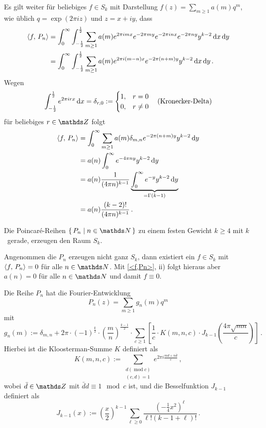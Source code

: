 \begin{bewe-list}
Es gilt weiter für beliebiges $f \in S_k$ mit Darstellung $f(z) = \sum_{m \geq 1} a(m)q^m$, wie üblich $q = \exp(2\pi iz)$ und $z = x + iy$, dass
\begin{align*}
	\scalarprd {f}{P_n} &= \int_0^\infty \int_{-\frac 12}^{\frac 12} \sum_{m \geq 1} a(m) e^{2 \pi imx}e^{-2\pi my}e^{-2\pi inx}e^{-2\pi ny}y^{k-2} \opd x \opd y\\
	&= \int_0^\infty \int_{-\frac 12}^{\frac 12} \sum_{m \geq 1} a(m) e^{2 \pi i(m-n)x}e^{-2\pi (n+m)y}y^{k-2} \opd x \opd y\,.
\end{align*}
Wegen 
\[
	\int_{- \frac 12}^{\frac 12} e^{2 \pi irx} \,\mathrm{d} x = \delta_{r,0} := \begin{cases}1, & r = 0\\0, & r \neq 0\end{cases} \quad \text{(Kronecker-Delta)}
\]
für beliebiges $r \in \ZZ$ folgt
\begin{align*}
	\scalarprd {f}{P_n} &= \int_0^\infty \sum_{m \geq 1} a(m) \delta_{m,n} e^{-2\pi (n+m)y}y^{k-2} \opd y \\
	&= a(n) \int_0^\infty e^{-4\pi ny} y^{k-2} \opd y \\
	&= a(n) \frac{1}{(4\pi n)^{k-1}} \underbrace{\int_0^\infty e^{-y} y^{k-2} \opd y}_{= \Gamma(k-1)} \\
	&= a(n) \frac{(k-2)!}{(4\pi n)^{k-1}}
	\,.
\end{align*}
\end{bewe-list}

\begin{koro}
Die Poincaré-Reihen $\Set{ P_n \mid n \in \NN}$ zu einem festen Gewicht $k \geq 4$ mit $k$~gerade, erzeugen den Raum $S_k$.
\end{koro}

\begin{bewe}
Angenommen die $P_n$ erzeugen nicht ganz $S_k$, dann existiert ein $f \in S_k$ mit $\scalarprd {f}{P_n} = 0$ für alle $n \in \NN$. Mit \autoref{<f,Pn>}, ii) folgt hieraus aber $a(n) = 0$ für alle $n \in \NN$ und damit $f \equiv 0$.
\end{bewe}

\begin{satz}\label{satz:Pn_Fourier}
Die Reihe $P_n$ hat die Fourier-Entwicklung
\[
	P_n(z) = \sum_{m \geq 1} g_n(m) q^m
\]
mit
\[
	g_n(m) := \delta_{m,n} + 2\pi \cdot (-1)^{\frac k2} \cdot \left(\frac mn\right)^{\frac {k-1}2} \cdot \sum_{c \geq 1} \left[ \frac 1c \cdot K(m,n,c) \cdot J_{k-1}\left(\frac{4\pi \sqrt{mn}}c\right) \right]
	\,.
\]
Hierbei ist die Kloosterman-Summe $K$ definiert als
\[
	K(m,n,c) := \sum_{\substack{d (\operatorname{mod} c) \\ (c,d)=1}} e^{2\pi i \frac{md + n\bar{d}}{c}}
	\,,
\]
wobei $\bar d \in \ZZ$ mit $\bar d d \equiv 1 \mod c$ ist, und die Besselfunktion $J_{k-1}$ definiert als
\[
	J_{k-1}(x) := \left(\frac x2\right)^{k-1} \sum_{\ell \geq 0} \frac{(-\frac 14 x^2)^\ell}{\ell! (k-1+\ell)!}
	\,.
\]
\end{satz}

